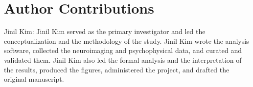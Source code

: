 \documentclass{imag-ms-template}
\begin{document}
\section*{Author Contributions}

%
%

Jinil Kim: Jinil Kim served as the primary investigator and led the
conceptualization and the methodology of the study. Jinil Kim wrote the analysis
software, collected the neuroimaging and psychophysical data, and curated and
validated them. Jinil Kim also led the formal analysis and the interpretation of
the results, produced the figures, administered the project, and drafted the
original manuscript.
\end{document}
